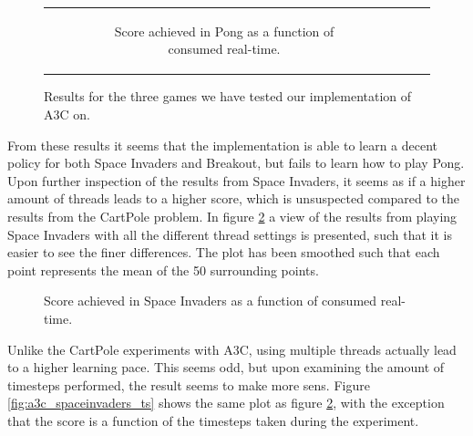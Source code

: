 \documentclass[11pt]{article}
\begin{document}
\begin{figure}[H]
\begin{tabular}[c]{ccc}
\begin{subfigure}[t]{.32\textwidth}
        \caption{Score achieved in Pong as a function of
        consumed real-time.}
    \end{subfigure}
  \end{tabular}
  \label{fig:all_atari}
  \caption{Results for the three games we have tested our implementation
           of A3C on.}
\end{figure}

From these results it seems that the implementation is able to learn
a decent policy for both Space Invaders and Breakout, but fails
to learn how to play Pong.
Upon further inspection of the results from Space Invaders, it seems as if
a higher amount of threads leads to a higher score, which is unsuspected
compared to the results from the CartPole problem.
In figure \ref{fig:a3c_spaceinvaders} a view of the results from
playing Space Invaders with all the different thread settings is presented,
such that it is easier to see the finer differences.
The plot has been smoothed such that each point represents the mean of the
50 surrounding points.

\begin{figure}[H]
    \caption{Score achieved in Space Invaders as a function of
    consumed real-time.}
    \label{fig:a3c_spaceinvaders}
\end{figure}

Unlike the CartPole experiments with A3C, using multiple threads
actually lead to a higher learning pace.
This seems odd, but upon examining the amount of timesteps performed,
the result seems to make more sens.
Figure \ref{fig:a3c_spaceinvaders_ts} shows the same plot as
figure \ref{fig:a3c_spaceinvaders}, with the
exception that the score is a function of the timesteps taken
during the experiment.
\end{document}
